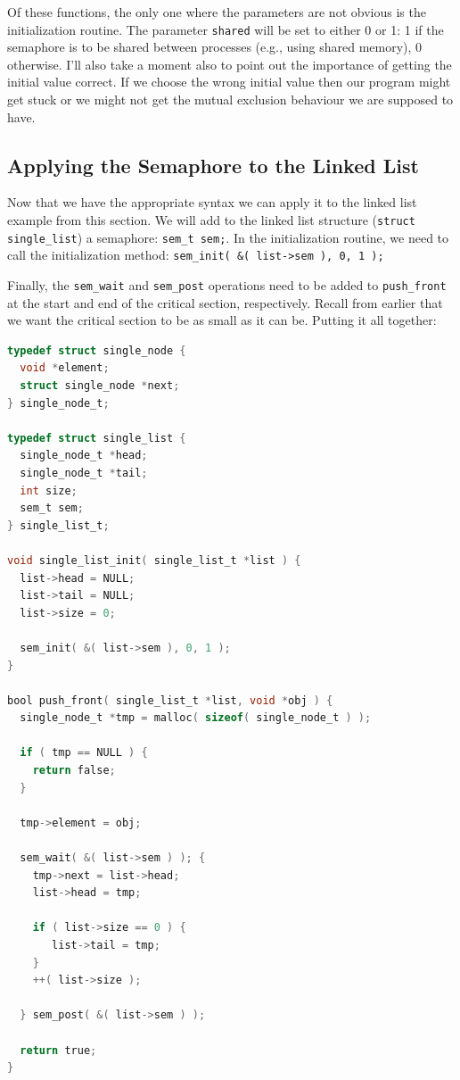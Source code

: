 Of these functions, the only one where the parameters are not obvious is the initialization routine. The parameter \texttt{shared} will be set to either 0 or 1: 1 if the semaphore is to be shared between processes (e.g., using shared memory), 0 otherwise. I'll also take a moment also to point out the importance of getting the initial value correct. If we choose the wrong initial value then our program might get stuck or we might not get the mutual exclusion behaviour we are supposed to have.

\subsection*{Applying the Semaphore to the Linked List}

Now that we have the appropriate syntax we can apply it to the linked list example from this section. We will add to the linked list structure (\texttt{struct single\_list}) a semaphore: \texttt{sem\_t sem;}. In the initialization routine, we need to call the initialization method: \texttt{sem\_init( \&( list->sem ), 0, 1 );}

Finally, the \texttt{sem\_wait} and \texttt{sem\_post} operations need to be added to \texttt{push\_front} at the start and end of the critical section, respectively. Recall from earlier that we want the critical section to be as small as it can be. Putting it all together:

\begin{lstlisting}[language=C]
typedef struct single_node {
  void *element;
  struct single_node *next;
} single_node_t;

typedef struct single_list {
  single_node_t *head;
  single_node_t *tail;
  int size;
  sem_t sem;
} single_list_t;

void single_list_init( single_list_t *list ) {
  list->head = NULL;
  list->tail = NULL;
  list->size = 0;

  sem_init( &( list->sem ), 0, 1 );
}

bool push_front( single_list_t *list, void *obj ) {
  single_node_t *tmp = malloc( sizeof( single_node_t ) );
  
  if ( tmp == NULL ) {
    return false;
  }
  
  tmp->element = obj;
  
  sem_wait( &( list->sem ) ); {
    tmp->next = list->head;
    list->head = tmp;

    if ( list->size == 0 ) {
       list->tail = tmp;
    }
    ++( list->size );
  
  } sem_post( &( list->sem ) );  
  
  return true;
}
\end{lstlisting}

